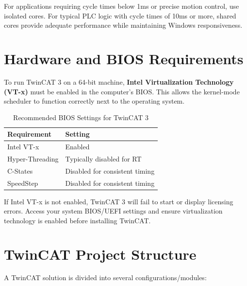 \documentclass[11pt,a4paper]{article}
\begin{document}
\begin{tipbox}
For applications requiring cycle times below 1ms or precise motion control, use isolated cores. For typical PLC logic with cycle times of 10ms or more, shared cores provide adequate performance while maintaining Windows responsiveness.
\end{tipbox}

\section{Hardware and BIOS Requirements}

To run TwinCAT 3 on a 64-bit machine, \textbf{Intel Virtualization Technology (VT-x)} must be enabled in the computer's BIOS. This allows the kernel-mode scheduler to function correctly next to the operating system.

\begin{table}[h]
\centering
\begin{tabular}{@{}ll@{}}
\toprule
\textbf{Requirement} & \textbf{Setting} \\
\midrule
Intel VT-x & Enabled \\
Hyper-Threading & Typically disabled for RT \\
C-States & Disabled for consistent timing \\
SpeedStep & Disabled for consistent timing \\
\bottomrule
\end{tabular}
\caption{Recommended BIOS Settings for TwinCAT 3}
\end{table}

\begin{warningbox}
If Intel VT-x is not enabled, TwinCAT 3 will fail to start or display licensing errors. Access your system BIOS/UEFI settings and ensure virtualization technology is enabled before installing TwinCAT.
\end{warningbox}

\section{TwinCAT Project Structure}

A TwinCAT solution is divided into several configurations/modules:
\end{document}
